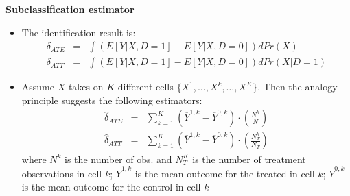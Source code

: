 \documentclass[notes=show]{beamer}
\begin{document}
\begin{frame}[plain]
	\begin{center}
	\textbf{Subclassification estimator}
	\end{center}
	
	\begin{itemize}
	\item The identification result is:
		\begin{eqnarray*}
		\delta_{ATE} &=& \int \left(E[Y|X,D=1] - E[Y|X,D=0]\right)dPr(X) \\
		\delta_{ATT} &=& \int \left(E[Y|X,D=1] - E[Y|X,D=0]\right)dPr(X|D=1)
		\end{eqnarray*}
	\item Assume $X$ takes on $K$ different cells $\{X^1, \dots, X^k, \dots, X^K\}$.  Then the analogy principle suggests the following estimators:
		\begin{eqnarray*}
		\widehat{\delta}_{ATE} &=& \sum_{k=1}^K(\overline{Y}^{1,k} - \overline{Y}^{0,k})\cdot\left(\frac{N^k}{N}\right) \\
		\widehat{\delta}_{ATT} &=& \sum_{k=1}^K(\overline{Y}^{1,k} - \overline{Y}^{0,k})\cdot\left(\frac{N_T^k}{N_T}\right) 
		\end{eqnarray*}where $N^k$ is the number of obs. and $N^K_T$ is the number of treatment observations in cell $k$; $\overline{Y}^{1,k}$ is the mean outcome for the treated in cell $k$; $\overline{Y}^{0,k}$ is the mean outcome for the control in cell $k$
	\end{itemize}
\end{frame}
\end{document}
